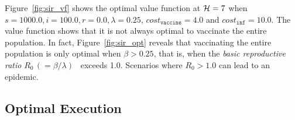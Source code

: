 Figure~\ref{fig:sir_vf} shows the optimal value function at {\footnotesize$ \mathcal{H} = 7 $} when {\footnotesize $ s = 1000.0, i = 100.0, r = 0.0, \lambda = 0.25 $}, {\footnotesize $ cost_{\mathtt{vaccine}} = 4.0$} and {\footnotesize $ cost_{\mathtt{inf}} = 10.0 $}. The value function shows that it is not always optimal to vaccinate the entire population. In fact, 
Figure~\ref{fig:sir_opt} reveals that vaccinating the entire population 
is only optimal when {\footnotesize $ \beta > 0.25 $}, that is, when the \textit{basic reproductive ratio} {\footnotesize $ R_0 \,(= \beta/\lambda)$}~\cite{Heffernan_2005} exceeds 1.0. 
Scenarios where {\footnotesize $R_0 > 1.0$} can lead to an epidemic. 

\subsection{Optimal Execution}
\label{sec:results_oe}

